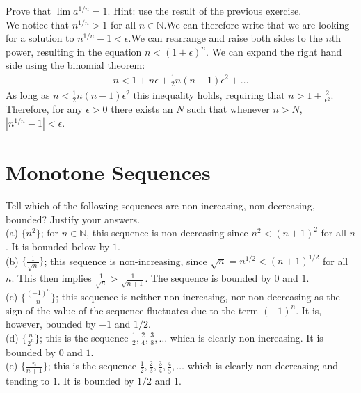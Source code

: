 \documentclass[12pt]{book}
\newcommand{\N}{\mathbb{N}}
\newenvironment{exercise}[2][Exercise]{\begin{trivlist}
\item[\hskip \labelsep {\bfseries #1}\hskip \labelsep {\bfseries #2.}]}{\end{trivlist}}
\begin{document}
\begin{exercise}{1.4.6}
\begin{exercise}{2.3.12}
Prove that $\lim a^{1/n} = 1$. Hint: use the result of the previous exercise.\\

We notice that $n^{1/n} > 1$ for all $n \in \N$.We can therefore write that we are looking for a solution to $n^{1/n} - 1 < \epsilon$.We can rearrange and raise both sides to the $n$th power, resulting in the equation $n < (1 + \epsilon)^n$. We can expand the right hand side using the binomial theorem:
	\begin{align*}
	n < 1+ n \epsilon + \frac{1}{2}n(n-1) \epsilon^2 + \hdots
	\end{align*}
As long as $n < \frac{1}{2} n(n-1) \epsilon^2$ this inequality holds, requiring that $n> 1+ \frac{2}{\epsilon^2}$. Therefore, for any $\epsilon >0$ there exists an $N$ such that whenever $n>N$,  $| n^{1/n} -1|< \epsilon$.
\end{exercise}


\section{Monotone Sequences}

\begin{exercise}{2.4.1}
Tell which of the following sequences are non-increasing, non-decreasing, bounded? Justify your answers.\\
(a) $\{n^2\}$; for $n \in \N$, this sequence is non-decreasing since $n^2 < (n+1)^2$ for all $n$. It is bounded below by $1$.\\
(b) $\{ \frac{1}{\sqrt{n}} \}$; this sequence is non-increasing, since $\sqrt{n}=n^{1/2}<(n+1)^{1/2}$ for all $n$. This then implies $\frac{1}{\sqrt{n}} > \frac{1}{\sqrt{n+1}}$. The sequence is bounded by $0$ and $1$. \\
(c) $\{ \frac{(-1)^n}{n} \}$;  this sequence is neither non-increasing, nor non-decreasing as the sign of the value of the sequence fluctuates due to the term $(-1)^n$. It is, however, bounded by $-1$ and $1/2$.\\
(d) $\{ \frac{n}{2^n} \}$; this is the sequence $\frac{1}{2},\frac{2}{4},\frac{3}{8},\hdots$ which is clearly non-increasing. It is bounded by $0$ and $1$. \\
(e) $\{ \frac{n}{n+1} \}$; this is the sequence $\frac{1}{2}, \frac{2}{3},\frac{3}{4},\frac{4}{5},\hdots$ which is clearly non-decreasing and tending to $1$. It is bounded by $1/2$ and $1$.
\end{exercise}



\end{exercise}
\end{document}
